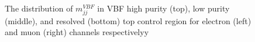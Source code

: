 \begin{figure}[ht]
    \\
	\caption{The distribution of $m_{jj}^{VBF}$ in VBF high purity (top), low purity (middle), and resolved (bottom) top control region for electron (left) and muon (right) channels respectivelyy}
	\label{Fig:mJJVBFTR}
\end{figure}

